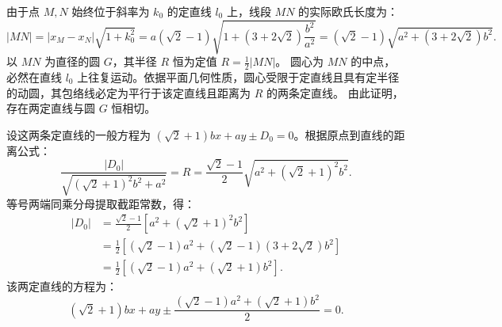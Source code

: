 \begin{solution}
由于点 $M, N$ 始终位于斜率为 $k_0$ 的定直线 $l_0$ 上，线段 $MN$ 的实际欧氏长度为：
\[ |MN| = |x_M - x_N|\sqrt{1+k_0^2} = a(\sqrt{2}-1)\sqrt{1 + (3+2\sqrt{2})\frac{b^2}{a^2}} = (\sqrt{2}-1)\sqrt{a^2 + (3+2\sqrt{2})b^2}. \]
以 $MN$ 为直径的圆 $G$，其半径 $R$ 恒为定值 $R = \frac{1}{2}|MN|$。
圆心为 $MN$ 的中点，必然在直线 $l_0$ 上往复运动。依据平面几何性质，圆心受限于定直线且具有定半径的动圆，其包络线必定为平行于该定直线且距离为 $R$ 的两条定直线。
由此证明，存在两定直线与圆 $G$ 恒相切。

设这两条定直线的一般方程为 $(\sqrt{2}+1)bx + ay \pm D_0 = 0$。根据原点到直线的距离公式：
\[ \frac{|D_0|}{\sqrt{(\sqrt{2}+1)^2 b^2 + a^2}} = R = \frac{\sqrt{2}-1}{2} \sqrt{a^2 + (\sqrt{2}+1)^2 b^2}. \]
等号两端同乘分母提取截距常数，得：
\begin{align*}
|D_0| &= \frac{\sqrt{2}-1}{2} \left[ a^2 + (\sqrt{2}+1)^2 b^2 \right] \\
&= \frac{1}{2} \left[ (\sqrt{2}-1)a^2 + (\sqrt{2}-1)(3+2\sqrt{2})b^2 \right] \\
&= \frac{1}{2} \left[ (\sqrt{2}-1)a^2 + (\sqrt{2}+1)b^2 \right].
\end{align*}
该两定直线的方程为：
\[ (\sqrt{2}+1)bx + ay \pm \frac{(\sqrt{2}-1)a^2 + (\sqrt{2}+1)b^2}{2} = 0. \]
\end{solution}

